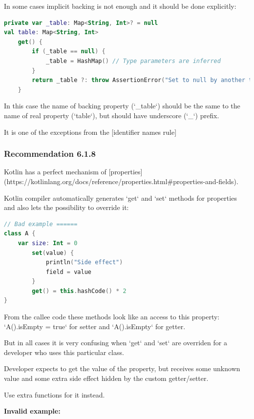 {{{{In some cases implicit backing is not enough and it should be done explicitly:

\begin{lstlisting}[language=Kotlin]
private var _table: Map<String, Int>? = null
val table: Map<String, Int>
    get() {
        if (_table == null) {
            _table = HashMap() // Type parameters are inferred
        }
        return _table ?: throw AssertionError("Set to null by another thread")
    }
\end{lstlisting}


In this case the name of backing property (`\_table`) should be the same to the name of real property (`table`), but should have underscore (`\_`) prefix.

It is one of the exceptions from the [identifier names rule]



\subsubsection*{\textbf{Recommendation 6.1.8}}
\leavevmode\newline

Kotlin has a perfect mechanism of [properties](https://kotlinlang.org/docs/reference/properties.html\#properties-and-fields).

Kotlin compiler automatically generates `get` and `set` methods for properties and also lets the possibility to override it:

\begin{lstlisting}[language=Kotlin]
// Bad example ======
class A {
    var size: Int = 0
        set(value) {
            println("Side effect")
            field = value
        }
        get() = this.hashCode() * 2
}
\end{lstlisting}


From the callee code these methods look like an access to this property: `A().isEmpty = true` for setter and `A().isEmpty` for getter.

But in all cases it is very confusing when `get` and `set` are overriden for a developer who uses this particular class. 

Developer expects to get the value of the property, but receives some unknown value and some extra side effect hidden by the custom getter/setter. 

Use extra functions for it instead.



\textbf{Invalid example:}

}}}}
